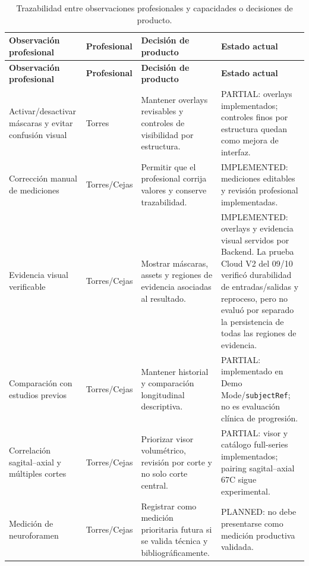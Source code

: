 {\scriptsize
\setlength{\LTleft}{0pt}
\setlength{\LTright}{0pt}
\setlength{\tabcolsep}{3pt}
\renewcommand{\arraystretch}{1.18}
\begin{longtable}{>{\raggedright\arraybackslash}p{} >{\raggedright\arraybackslash}p{} >{\raggedright\arraybackslash}p{} >{\raggedright\arraybackslash}p{}}
\caption{Trazabilidad entre observaciones profesionales y capacidades o decisiones de producto.}\label{tab:h-cambios-producto-validacion-profesional}\\
\hline
\textbf{Observación profesional} & \textbf{Profesional} & \textbf{Decisión de producto} & \textbf{Estado actual} \\
\hline
\endfirsthead
\hline
\textbf{Observación profesional} & \textbf{Profesional} & \textbf{Decisión de producto} & \textbf{Estado actual} \\
\hline
\endhead
\hline
\endfoot
Activar/desactivar máscaras y evitar confusión visual & Torres & Mantener overlays revisables y controles de visibilidad por estructura. & PARTIAL: overlays implementados; controles finos por estructura quedan como mejora de interfaz. \\
Corrección manual de mediciones & Torres/Cejas & Permitir que el profesional corrija valores y conserve trazabilidad. & IMPLEMENTED: mediciones editables y revisión profesional implementadas. \\
Evidencia visual verificable & Torres/Cejas & Mostrar máscaras, assets y regiones de evidencia asociadas al resultado. & IMPLEMENTED: overlays y evidencia visual servidos por Backend. La prueba Cloud V2 del 09/10 verificó durabilidad de entradas/salidas y reproceso, pero no evaluó por separado la persistencia de todas las regiones de evidencia. \\
Comparación con estudios previos & Torres/Cejas & Mantener historial y comparación longitudinal descriptiva. & PARTIAL: implementado en Demo Mode/\texttt{subjectRef}; no es evaluación clínica de progresión. \\
Correlación sagital--axial y múltiples cortes & Torres/Cejas & Priorizar visor volumétrico, revisión por corte y no solo corte central. & PARTIAL: visor y catálogo full-series implementados; pairing sagital--axial 67C sigue experimental. \\
Medición de neuroforamen & Torres/Cejas & Registrar como medición prioritaria futura si se valida técnica y bibliográficamente. & PLANNED: no debe presentarse como medición productiva validada. \\

\end{longtable}}
